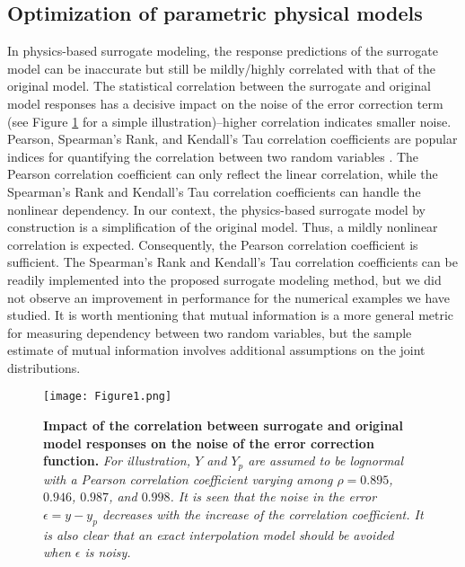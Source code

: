 \documentclass[number,preprint,3p]{elsarticle}
\newcommand{\1}[2]{\mathbb{I}_{#1}\left(#2\right)}
\begin{document}
	\subsection{Optimization of parametric physical models}\label{Sec:optimization}
	\noindent In physics-based surrogate modeling, the response predictions of the surrogate model can be inaccurate but still be mildly/highly correlated with that of the original model. The statistical correlation between the surrogate and original model responses has a decisive impact on the noise of the error correction term (see Figure \ref{Fig:Figure1} for a simple illustration)--higher correlation indicates smaller noise. Pearson, Spearman's Rank, and Kendall's Tau correlation coefficients are popular indices for quantifying the correlation between two random variables \cite{hauke2011comparison}. The Pearson correlation coefficient can only reflect the linear correlation, while the Spearman's Rank and Kendall's Tau correlation coefficients can handle the nonlinear dependency. In our context, the physics-based surrogate model by construction is a simplification of the original model. Thus, a mildly nonlinear correlation is expected. Consequently, the Pearson correlation coefficient is sufficient. The Spearman's Rank and Kendall's Tau correlation coefficients can be readily implemented into the proposed surrogate modeling method, but we did not observe an improvement in performance for the  numerical examples we have studied. { It is worth mentioning that mutual information \cite{taverniers2021mutual,beneddine2023nonlinear} is a more general metric for measuring dependency between two random variables, but the sample estimate of mutual information involves additional assumptions on the joint distributions.}

 \begin{figure}[H]
		\centering
		\texttt{[image: Figure1.png]}
		\caption{\textbf{Impact of the correlation between surrogate and original model responses on the noise of the error correction function.} \textit{For illustration, $Y$ and $Y_{p}$ are assumed to be lognormal with a Pearson correlation coefficient varying among $\rho=0.895$, $0.946$, $0.987$, and $0.998$. It is seen that the noise in the error $\epsilon=y-y_p$ decreases with the increase of the correlation coefficient. It is also clear that an exact interpolation model should be avoided when $\epsilon$ is noisy.}}
		\label{Fig:Figure1}
	\end{figure}
 
\end{document}
